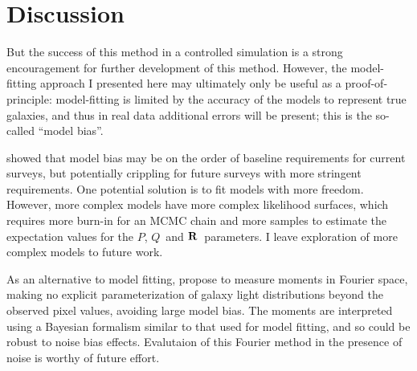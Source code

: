 \documentclass[usegraphicx,usenatbib]{mn2e}
\newcommand{\vecQ}{\mbox{\boldmath $Q$}}
\newcommand{\matR}{\mbox{$\bf R$}}
\begin{document}

\section{Discussion} \label{sec:summary}

But the success of this method in a controlled simulation is a strong
encouragement for further development of this method.  However, the
model-fitting approach I presented here may ultimately only be useful as a
proof-of-principle: model-fitting is limited by the accuracy of the models to
represent true galaxies, and thus in real data additional errors will be
present; this is the so-called ``model bias''.  

\cite{Kacprzak13} showed that model bias may be on the order of baseline
requirements for current surveys, but potentially crippling for future surveys
with more stringent requirements. One potential solution is to fit models with
more freedom.  However, more complex models have more complex likelihood
surfaces, which requires more burn-in for an MCMC chain and more samples to
estimate the expectation values for the $P$, \vecQ\ and \matR\ parameters.
I leave exploration of more complex models to future work.


As an alternative to model fitting, \cite{ba14} propose to measure moments in
Fourier space, making no explicit parameterization of galaxy light
distributions beyond the observed pixel values, avoiding large model bias.  The
moments are interpreted using a Bayesian formalism similar to that used for model
fitting, and so could be robust to noise bias effects.  Evalutaion of this
Fourier method in the presence of noise is worthy of future effort.
\end{document}
